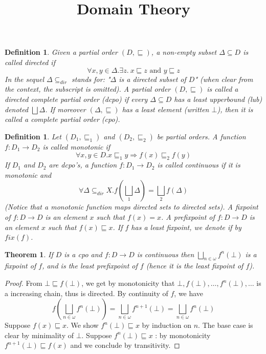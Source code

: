 \documentclass[12pt]{article}
\newtheorem{definition}[section]{Definition}
\newtheorem{theorem}[section]{Theorem}
\begin{document}
\title{Domain Theory}
\begin{definition}
    Given a partial order $(D, \sqsubseteq)$, a non-empty subset
    $\Delta \subseteq D$ is called directed if 
    $$
    \forall x,y \in \Delta. \exists z.~x \sqsubseteq z {\text{ and }} y \sqsubseteq z
    $$
    In the sequel $\Delta \subseteq_{dir}$ stands for: "$\Delta$ is a directed 
    subset of $D$" (when clear from the context, the subscript is omitted).
    A partial order $(D,\sqsubseteq)$ is called a directed complete partial order (dcpo)
    if every $\Delta \subseteq D$ has a least upperbound (lub) denoted $\bigsqcup \Delta$.
    If moreover $(\Delta,\sqsubseteq)$ has a least element (written $\bot$), then it
    is called a complete partial order (cpo). 
\end{definition}
\begin{definition} 
    Let $(D_1,\sqsubseteq_1)$ and $(D_2,\sqsubseteq_2)$ be partial orders.
    A function $f : D_1 \rightarrow D_2$ is called monotonic if 
    $$
    \forall x,y \in D. x \sqsubseteq_1 y \Rightarrow f(x) \sqsubseteq_2 f(y)
    $$
    If $D_1$ and $D_2$ are dcpo's, a function $f : D_1 \rightarrow D_2$ is called
    continuous if it is monotonic and
    $$
        \forall \Delta \subseteq_{dir} X.f(\bigsqcup_1 \Delta) = \bigsqcup_2 f (\Delta)
    $$
    (Notice that a monotonic function maps directed sets to directed sets).
    A fixpoint of $f : D \rightarrow D$ is an element $x$ such that $f(x)=x$.
    A prefixpoint of $f : D \rightarrow D$ is an element $x$ such that 
    $f(x) \sqsubseteq x$. If $f$ has a least fixpoint, we denote if by $fix(f)$.
\end{definition}
\begin{theorem}
If $D$ is a cpo and $f : D \rightarrow D$ is continuous then
$\bigsqcup_{n \in \omega}f^n(\bot)$ is a fixpoint of $f$, and 
is the least prefixpoint of $f$ (hence it is the least fixpoint of $f$).    
\end{theorem}
\begin{proof}
    From $\bot \sqsubseteq f(\bot)$, we get by monotonicity that
    $\bot,f(\bot),\ldots,f^n(\bot),\ldots$ is a increasing chain, 
    thus is directed. By continuity of $f$, we have
    $$
    f(\bigsqcup_{n\in \omega}f^n(\bot)) = 
    \bigsqcup_{n \in \omega} f^{n+1}(\bot) = 
    \bigsqcup_{n \in \omega} f^n(\bot)
    $$
    Suppose $f(x) \sqsubseteq x$. 
    We show $f^n(\bot) \sqsubseteq x$ by induction on $n$.
    The base case is clear by minimality of $\bot$. Suppose $f^n(\bot) \sqsubseteq x$ :
    by monotonicity $f^{n+1}(\bot) \sqsubseteq f(x)$ and we conclude by transitivity.
\end{proof}
\end{document}
